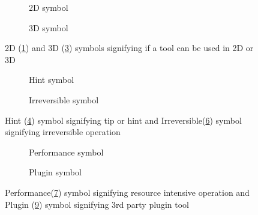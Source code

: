\begin{figure}[h]
	\begin{centering}
		\begin{subfigure}{0.5\textwidth}
			
			\caption{2D symbol}
			\label{fig:2d_icon}
		\end{subfigure}
		\begin{subfigure}{0.5\textwidth}
			
			\caption{3D symbol}
			\label{fig:3d_icon}
		\end{subfigure}
	\end{centering}
	\caption{2D (\cref{fig:2d_icon}) and 3D (\cref{fig:3d_icon}) symbols signifying if a tool can be used in 2D or 3D}
\end{figure}

\begin{figure}[h]
	\begin{centering}
		\begin{subfigure}{0.5\textwidth}
			
			\caption{Hint symbol}
			\label{fig:hint_icon}
		\end{subfigure}
		\begin{subfigure}{0.5\textwidth}
			
			\caption{Irreversible symbol}
			\label{fig:noundo_icon}
		\end{subfigure}
	\end{centering}
	\caption{Hint (\cref{fig:hint_icon}) symbol signifying tip or hint and Irreversible(\cref{fig:noundo_icon}) symbol signifying irreversible operation}
\end{figure}

\begin{figure}[h]
	\begin{centering}
		\begin{subfigure}{0.5\textwidth}
			
			\caption{Performance symbol}
			\label{fig:performance_icon}
		\end{subfigure}
		\begin{subfigure}{0.5\textwidth}
			
			\caption{Plugin symbol}
			\label{fig:plugin_icon}
		\end{subfigure}
	\end{centering}
	\caption{Performance(\cref{fig:performance_icon}) symbol signifying resource intensive operation and Plugin (\cref{fig:plugin_icon}) symbol signifying 3rd party plugin tool}
\end{figure}



